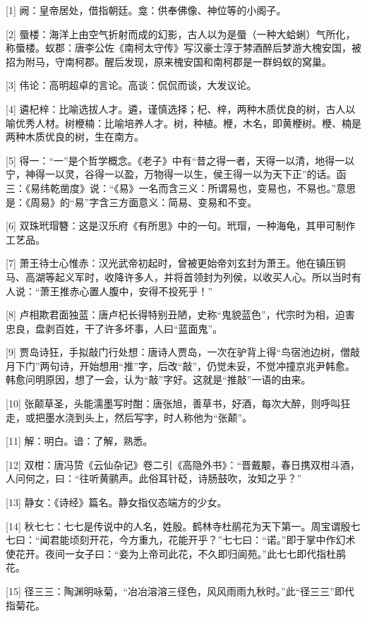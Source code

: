 \documentclass[12pt,UTF8]{ctexbook}
\begin{document}
[1] 阙：皇帝居处，借指朝廷。龛：供奉佛像、神位等的小阁子。

[2] 蜃楼：海洋上由空气折射而成的幻影，古人以为是蜃（一种大蛤蜊）气所化，称蜃楼。蚁郡：唐李公佐《南柯太守传》写汉豪士淳于棼酒醉后梦游大槐安国，被招为附马，守南柯郡。醒后发现，原来槐安国和南柯郡是一群蚂蚁的窝巢。

[3] 伟论：高明超卓的言论。高谈：侃侃而谈，大发议论。

[4] 遴杞梓：比喻选拔人才。遴，谨慎选择；杞、梓，两种木质优良的树，古人以喻优秀人材。树楩楠：比喻培养人才。树，种植。楩，木名，即黄楩树。楩、楠是两种木质优良的树，生在南方。

[5] 得一：“一”是个哲学概念。《老子》中有“昔之得一者，天得一以清，地得一以宁，神得一以灵，谷得一以盈，万物得一以生，侯王得一以为天下正”的话。函三：《易纬乾凿度》说：“《易》一名而含三义：所谓易也，变易也，不易也。”意思是：《周易》的“易”字含三方面意义：简易、变易和不变。

[6] 双珠玳瑁簪：这是汉乐府《有所思》中的一句。玳瑁，一种海龟，其甲可制作工艺品。

[7] 萧王待士心惟赤：汉光武帝初起时，曾被更始帝刘玄封为萧王。他在镇压铜马、高湖等起义军时，收降许多人，并将首领封为列侯，以收买人心。所以当时有人说：“萧王推赤心置人腹中，安得不投死乎！”

[8] 卢相欺君面独蓝：唐卢杞长得特别丑陋，史称“鬼貌蓝色”，代宗时为相，迫害忠良，盘剥百姓，干了许多坏事，人曰“蓝面鬼”。

[9] 贾岛诗狂，手拟敲门行处想：唐诗人贾岛，一次在驴背上得“鸟宿池边树，僧敲月下门”两句诗，开始想用“推”字，后改“敲”，仍觉未妥，不觉冲撞京兆尹韩愈。韩愈问明原因，想了一会，认为“敲”字好。这就是“推敲”一语的由来。

[10] 张颠草圣，头能濡墨写时酣：唐张旭，善草书，好酒，每次大醉，则呼叫狂走，或把墨水浇到头上，然后写字，时人称他为“张颠”。

[11] 解：明白。谙：了解，熟悉。

[12] 双柑：唐冯贽《云仙杂记》卷二引《高隐外书》：“晋戴颙，春日携双柑斗酒，人问何之，曰：“往听黄鹂声。此俗耳针砭，诗肠鼓吹，汝知之乎？”

[13] 静女：《诗经》篇名。静女指仪态端方的少女。

[14] 秋七七：七七是传说中的人名，姓殷。鹤林寺杜鹃花为天下第一。周宝谓殷七七曰：“闻君能顷刻开花，今方重九，花能开乎？”七七曰：“诺。”即于掌中作幻术使花开。夜间一女子曰：“妾为上帝司此花，不久即归阆苑。”此七七即代指杜鹃花。

[15] 径三三：陶渊明咏菊，“冶冶溶溶三径色，风风雨雨九秋时。”此“径三三”即代指菊花。
\end{document}
